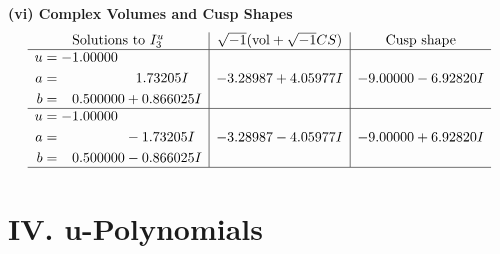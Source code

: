 \documentclass[1p]{elsarticle_modified}
\theoremstyle{definition}
\newcommand{\I}{\sqrt{-1}}
\begin{document}
\newpage\flushleft \textbf{(vi) Complex Volumes and Cusp Shapes}
$$\begin{array}{c|c|c}  
\text{Solutions to }I^u_{3}& \I (\text{vol} + \sqrt{-1}CS) & \text{Cusp shape}\\
 \hline 
\begin{aligned}
u &= -1.00000\phantom{ +0.000000I} \\
a &= \phantom{-0.000000 -}1.73205 I \\
b &= \phantom{-}0.500000 + 0.866025 I\end{aligned}
 & -3.28987 + 4.05977 I & -9.00000 - 6.92820 I \\ \hline\begin{aligned}
u &= -1.00000\phantom{ +0.000000I} \\
a &= \phantom{-0.000000 } -1.73205 I \\
b &= \phantom{-}0.500000 - 0.866025 I\end{aligned}
 & -3.28987 - 4.05977 I & -9.00000 + 6.92820 I\\
 \hline 
 \end{array}$$\newpage
\newpage\renewcommand{\arraystretch}{1}
\centering \section*{ IV. u-Polynomials}
\end{document}
